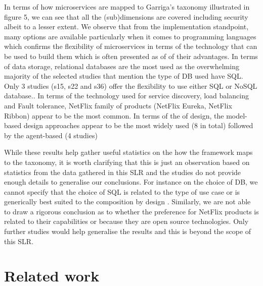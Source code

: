 \documentclass{article}
\begin{document}
\begin{multicols}{2}
In terms of how microservices are mapped to Garriga's taxonomy illustrated in figure 5, we can see that all the (sub)dimensions are covered including security albeit to a lesser extent. We observe that from the implementation standpoint, many options are available particularly when it comes to programming languages which confirms the flexibility of microservices in terms of the technology that can be used to build them which is often presented as of of their advantages. In terms of data storage, relational databases are the most used as the overwhelming majority of the selected studies that mention the type of DB used have SQL. Only 3 studies (s15, s22 and s36) offer the flexibility to use either SQL or NoSQL database.. In terms of the technology used for service discovery, load balancing and Fault tolerance, NetFlix family of products (NetFlix Eureka, NetFlix Ribbon) appear to be the most common. In terms of the of design, the model-based design approaches appear to be the most widely used (8 in total) followed by the agent-based (4 studies)

While these results help gather useful statistics on the how the framework maps to the taxonomy, it is worth clarifying that this is just an observation based on statistics from the data gathered in this SLR and the studies do not provide enough details to generalise our conclusions. For instance on the choice of DB, we cannot specify that the choice of SQL is related to the type of use case or is generically best suited to the composition by design . Similarly, we are not able to draw a rigorous conclusion as to whether the preference for NetFlix products is related to their capabilities or because they are open source technologies. Only further studies would help generalise the results and this is beyond the scope of this SLR.

\section{Related work}


\end{multicols}
\end{document}
